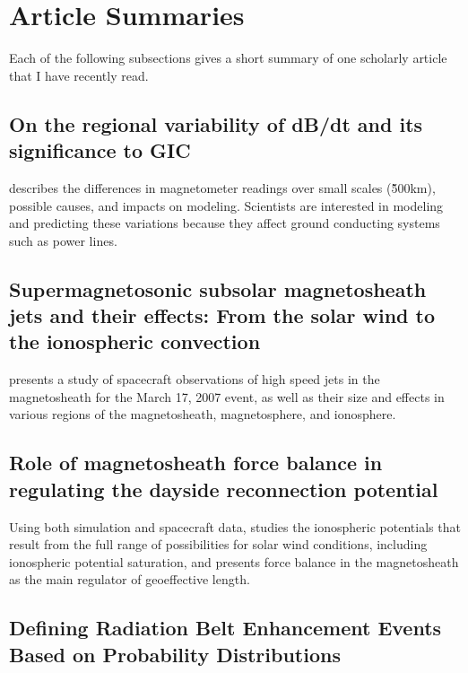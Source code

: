 \documentclass[12pt, letterpaper]{article}
\begin{document}
\section{Article Summaries}


Each of the following subsections gives a short summary of one scholarly article that I have recently read. 


\subsection{On the regional variability of dB/dt and its significance to GIC}

\citet[]{Dimmock2020} describes the differences in magnetometer readings over small scales (\~500km), possible causes, and impacts on modeling. Scientists are interested in modeling and predicting these variations because they affect ground conducting systems such as power lines.


\subsection{Supermagnetosonic subsolar magnetosheath jets and their effects: From the solar wind to the ionospheric convection}

\citet[]{Hietala2012} presents a study of spacecraft observations of high speed jets in the magnetosheath for the March 17, 2007 event, as well as their size and effects in various regions of the magnetosheath, magnetosphere, and ionosphere.


\subsection{Role of magnetosheath force balance in regulating the dayside reconnection potential}

Using both simulation and spacecraft data, \citet[]{Lopez2010} studies the ionospheric potentials that result from the full range of possibilities for solar wind conditions, including ionospheric potential saturation, and presents force balance in the magnetosheath as the main regulator of geoeffective length. 

\begin{flushleft}
  \subsection{Defining Radiation Belt Enhancement Events Based on Probability Distributions}
\end{flushleft}
\end{document}
